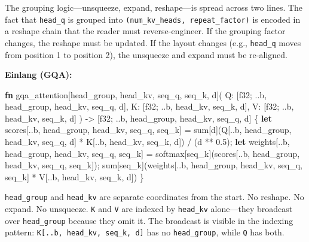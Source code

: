 \documentclass[11pt,titlepage]{article}
\newenvironment{Shaded}{}{}
\newcommand{\DataTypeTok}[1]{\textcolor[rgb]{0.56,0.13,0.00}{#1}}
\newcommand{\DecValTok}[1]{\textcolor[rgb]{0.25,0.63,0.44}{#1}}
\newcommand{\KeywordTok}[1]{\textcolor[rgb]{0.00,0.44,0.13}{\textbf{#1}}}
\newcommand{\NormalTok}[1]{#1}
\newcommand{\OperatorTok}[1]{\textcolor[rgb]{0.40,0.40,0.40}{#1}}
\begin{document}
The grouping logic---unsqueeze, expand, reshape---is spread across two
lines. The fact that \texttt{head\_q} is grouped into
\texttt{(num\_kv\_heads,\ repeat\_factor)} is encoded in a reshape chain
that the reader must reverse-engineer. If the grouping factor changes,
the reshape must be updated. If the layout changes (e.g.,
\texttt{head\_q} moves from position 1 to position 2), the unsqueeze and
expand must be re-aligned.

\textbf{Einlang (GQA):}

\begin{Shaded}
\begin{Highlighting}[]
\KeywordTok{fn}\NormalTok{ gqa_attention[head_group, head_kv, seq_q, seq_k, d](}
\NormalTok{    Q: }\OperatorTok{[}\DataTypeTok{f32}\NormalTok{; ..b, head_group, head_kv, seq_q, d}\OperatorTok{]}\NormalTok{,}
\NormalTok{    K: }\OperatorTok{[}\DataTypeTok{f32}\NormalTok{; ..b, head_kv, seq_k, d}\OperatorTok{]}\NormalTok{,}
\NormalTok{    V: }\OperatorTok{[}\DataTypeTok{f32}\NormalTok{; ..b, head_kv, seq_k, d}\OperatorTok{]}
\NormalTok{) -> }\OperatorTok{[}\DataTypeTok{f32}\NormalTok{; ..b, head_group, head_kv, seq_q, d}\OperatorTok{]}
\OperatorTok{\{}
    \KeywordTok{let}\NormalTok{ scores}\OperatorTok{[}\NormalTok{..b, head_group, head_kv, seq_q, seq_k}\OperatorTok{]}\NormalTok{ =}
\NormalTok{        sum}\OperatorTok{[}\NormalTok{d}\OperatorTok{]}\NormalTok{(Q}\OperatorTok{[}\NormalTok{..b, head_group, head_kv, seq_q, d}\OperatorTok{]}
\NormalTok{             * K}\OperatorTok{[}\NormalTok{..b, head_kv, seq_k, d}\OperatorTok{]}\NormalTok{) / (d ** }\DecValTok{0.5}\NormalTok{);}
    \KeywordTok{let}\NormalTok{ weights}\OperatorTok{[}\NormalTok{..b, head_group, head_kv, seq_q, seq_k}\OperatorTok{]}\NormalTok{ =}
\NormalTok{        softmax}\OperatorTok{[}\NormalTok{seq_k}\OperatorTok{]}\NormalTok{(scores}\OperatorTok{[}\NormalTok{..b, head_group, head_kv, seq_q, seq_k}\OperatorTok{]}\NormalTok{);}
\NormalTok{    sum}\OperatorTok{[}\NormalTok{seq_k}\OperatorTok{]}\NormalTok{(weights}\OperatorTok{[}\NormalTok{..b, head_group, head_kv, seq_q, seq_k}\OperatorTok{]}
\NormalTok{             * V}\OperatorTok{[}\NormalTok{..b, head_kv, seq_k, d}\OperatorTok{]}\NormalTok{)}
\OperatorTok{\}}
\end{Highlighting}
\end{Shaded}

\texttt{head\_group} and \texttt{head\_kv} are separate coordinates from
the start. No reshape. No expand. No unsqueeze. \texttt{K} and
\texttt{V} are indexed by \texttt{head\_kv} alone---they broadcast over
\texttt{head\_group} because they omit it. The broadcast is visible in
the indexing pattern: \texttt{K{[}..b,\ head\_kv,\ seq\_k,\ d{]}} has no
\texttt{head\_group}, while \texttt{Q} has both.
\end{document}
